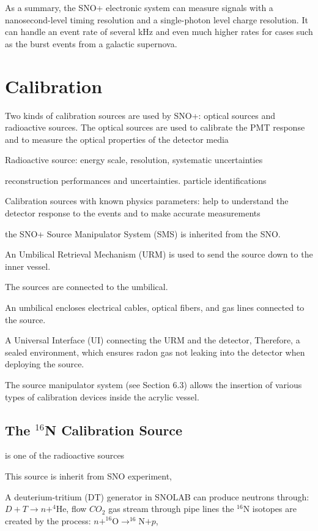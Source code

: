 As a summary, the SNO+ electronic system can measure signals with a nanosecond-level timing resolution and a single-photon level charge resolution. It can handle an event rate of several kHz and even much higher rates for cases such as the burst events from a galactic supernova\cite{snop_nim}.

\section{Calibration}
Two kinds of calibration sources are used by SNO+: optical sources and radioactive sources. 
The optical sources are used to calibrate the PMT response and to measure the optical properties of the 
detector media 

Radioactive source: energy scale, resolution, systematic
uncertainties

reconstruction performances and uncertainties.
particle identifications

Calibration sources with known physics parameters: help to understand the detector response to the events and to make accurate measurements

the SNO+ Source Manipulator System (SMS) is inherited from the SNO.

An Umbilical Retrieval Mechanism (URM) is used to send the source down to the inner vessel.

The sources are connected to the umbilical.

An umbilical encloses electrical cables, optical fibers, and gas lines connected to the source.

A Universal Interface (UI) connecting the URM and the detector, 
Therefore, a sealed environment, which 
ensures radon gas not leaking into the detector when deploying the source.

The source manipulator system (see Section 6.3) allows the insertion of various types of calibration
devices inside the acrylic vessel. 

\subsection{The $^{16}$N Calibration Source}


 is one of the radioactive sources

This source is inherit from SNO experiment\cite{dragowsky1999sudbury,dragowsky200216n,hamer2001energy}, 

A deuterium-tritium (DT) generator in SNOLAB can produce neutrons through: $D+T\to n+^{4}$He, 
flow $CO_2$ gas stream through pipe lines
the $^{16}$N isotopes are created by the process: $n+^{16}$O$\to^{16}$N$+p$,


